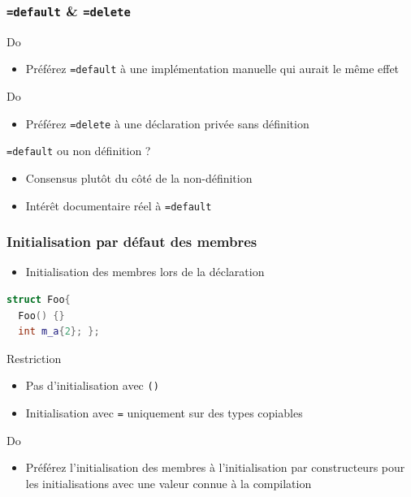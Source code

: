 \documentclass[C++.tex]{subfiles}
\begin{document}
\begin{frame}[fragile]
	\frametitle{\lstinline|=default| \& \lstinline|=delete|}
	\begin{exampleblock}{Do}
		\begin{itemize}
			\item Préférez \lstinline|=default| à une implémentation manuelle qui aurait le même effet
		\end{itemize}
	\end{exampleblock}

	\begin{exampleblock}{Do}
		\begin{itemize}
			\item Préférez \lstinline|=delete| à une déclaration privée sans définition
		\end{itemize}
	\end{exampleblock}

	\begin{block}{\lstinline|=default| ou non définition ?}
		\begin{itemize}
			\item Consensus plutôt du côté de la non-définition
			\item Intérêt documentaire réel à \lstinline|=default|
		\end{itemize}
	\end{block}
\end{frame}

\begin{frame}[fragile]
	\frametitle{Initialisation par défaut des membres}
	\begin{itemize}
		\item Initialisation des membres lors de la déclaration
	\end{itemize}

	\begin{lstlisting}[language=C++]
struct Foo{
  Foo() {}
  int m_a{2}; };\end{lstlisting}

	\begin{alertblock}{Restriction}
		\begin{itemize}
			\item Pas d'initialisation avec \lstinline|()|
			\item Initialisation avec \lstinline|=| uniquement sur des types copiables
		\end{itemize}
	\end{alertblock}

	\begin{exampleblock}{Do}
		\begin{itemize}
			\item Préférez l'initialisation des membres à l'initialisation par constructeurs pour les initialisations avec une valeur connue à la compilation
		\end{itemize}

	\end{exampleblock}
\end{frame}
\end{document}
